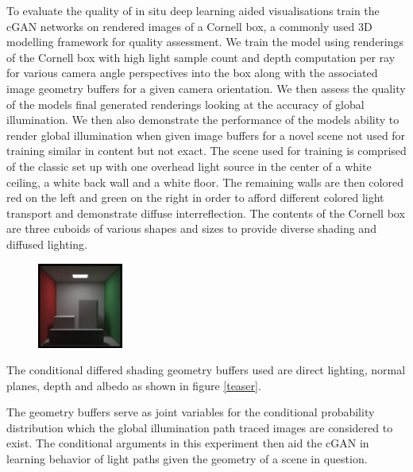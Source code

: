 \documentclass[conference]{IEEEtran}
\begin{document}
To evaluate the quality of in situ deep learning aided visualisations train the cGAN networks on rendered images of a Cornell box, a commonly used 3D modelling framework for quality assessment. We train the model using renderings of the Cornell box with high light sample count and depth computation per ray for various camera angle perspectives into the box along with the associated image geometry buffers for a given camera orientation. We then assess the quality of the models final generated renderings looking at the accuracy of global illumination. We then also demonstrate the performance of the models ability to render global illumination when given image buffers for a novel scene not used for training similar in content but not exact. The scene used for training is comprised of the classic set up with one overhead light source in the center of a white ceiling, a white back wall and a white floor. The remaining walls are then colored red on the left and green on the right in order to afford different colored light transport and demonstrate diffuse interreflection. The contents of the Cornell box are three cuboids of various shapes and sizes to provide diverse shading and diffused lighting. 

\begin{figure}[h]
\includegraphics[width=0.25\textwidth]{sc-1080-d-45.png}
\end{figure}

The conditional differed shading geometry buffers used are direct lighting, normal planes, depth and albedo as shown in figure \ref{teaser}.

The geometry buffers serve as joint variables for the conditional probability distribution which the global illumination path traced images are considered to exist. The conditional arguments in this experiment then aid the cGAN in learning behavior of light paths given the geometry of a scene in question. 
\end{document}
